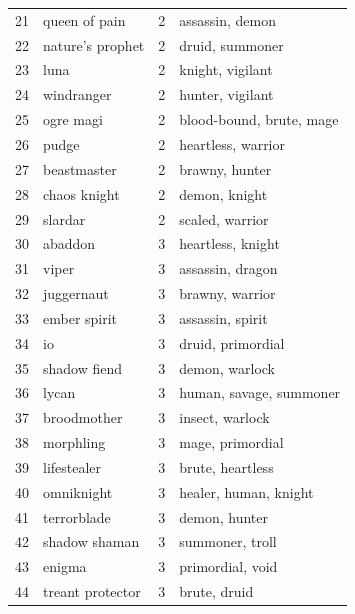 \documentclass{article}
\begin{document}
\begin{table}
{\begin{tabular}{llrl}
21 &        queen of pain &      2 &                assassin, demon \\
22 &     nature's prophet &      2 &                druid, summoner \\
23 &                 luna &      2 &               knight, vigilant \\
24 &           windranger &      2 &               hunter, vigilant \\
25 &            ogre magi &      2 &       blood-bound, brute, mage \\
26 &                pudge &      2 &            heartless, warrior  \\
27 &          beastmaster &      2 &                 brawny, hunter \\
28 &         chaos knight &      2 &                  demon, knight \\
29 &              slardar &      2 &               scaled, warrior  \\
30 &              abaddon &      3 &              heartless, knight \\
31 &                viper &      3 &               assassin, dragon \\
32 &           juggernaut &      3 &               brawny, warrior  \\
33 &         ember spirit &      3 &               assassin, spirit \\
34 &                   io &      3 &              druid, primordial \\
35 &         shadow fiend &      3 &                demon, warlock  \\
36 &                lycan &      3 &        human, savage, summoner \\
37 &          broodmother &      3 &               insect, warlock  \\
38 &            morphling &      3 &               mage, primordial \\
39 &          lifestealer &      3 &               brute, heartless \\
40 &           omniknight &      3 &          healer, human, knight \\
41 &          terrorblade &      3 &                  demon, hunter \\
42 &        shadow shaman &      3 &                summoner, troll \\
43 &               enigma &      3 &               primordial, void \\
44 &     treant protector &      3 &                   brute, druid \\

\end{tabular}}
\end{table}
\end{document}
